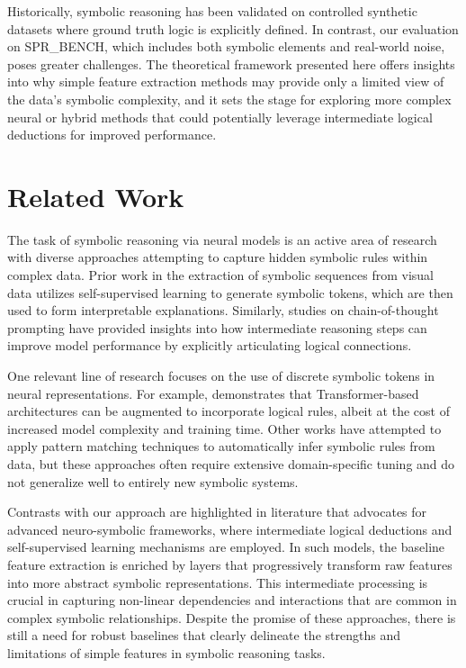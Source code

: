 \documentclass{article}
\begin{document}
Historically, symbolic reasoning has been validated on controlled synthetic datasets where ground truth logic is explicitly defined. In contrast, our evaluation on SPR\_BENCH, which includes both symbolic elements and real-world noise, poses greater challenges. The theoretical framework presented here offers insights into why simple feature extraction methods may provide only a limited view of the data's symbolic complexity, and it sets the stage for exploring more complex neural or hybrid methods that could potentially leverage intermediate logical deductions for improved performance.

\section{Related Work}
The task of symbolic reasoning via neural models is an active area of research with diverse approaches attempting to capture hidden symbolic rules within complex data. Prior work in the extraction of symbolic sequences from visual data \cite{symbolic_visual} utilizes self-supervised learning to generate symbolic tokens, which are then used to form interpretable explanations. Similarly, studies on chain-of-thought prompting have provided insights into how intermediate reasoning steps can improve model performance by explicitly articulating logical connections.

One relevant line of research focuses on the use of discrete symbolic tokens in neural representations. For example, \cite{transformers_symbolic} demonstrates that Transformer-based architectures can be augmented to incorporate logical rules, albeit at the cost of increased model complexity and training time. Other works have attempted to apply pattern matching techniques \cite{pattern_matching} to automatically infer symbolic rules from data, but these approaches often require extensive domain-specific tuning and do not generalize well to entirely new symbolic systems.

Contrasts with our approach are highlighted in literature that advocates for advanced neuro-symbolic frameworks, where intermediate logical deductions and self-supervised learning mechanisms are employed. In such models, the baseline feature extraction is enriched by layers that progressively transform raw features into more abstract symbolic representations. This intermediate processing is crucial in capturing non-linear dependencies and interactions that are common in complex symbolic relationships. Despite the promise of these approaches, there is still a need for robust baselines that clearly delineate the strengths and limitations of simple features in symbolic reasoning tasks.
\end{document}
